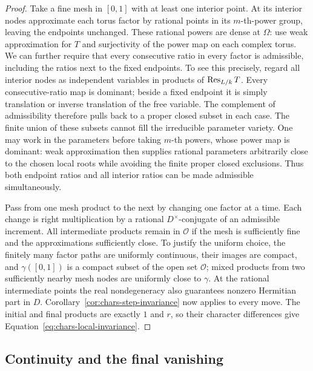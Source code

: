 \begin{proof}
Take a fine mesh in $[0,1]$ with at least one interior point. At its
interior nodes approximate each torus factor by rational points in its
$m$-th-power group, leaving the endpoints unchanged. These rational
powers are dense at $\Omega$: use weak approximation for $T$ and
surjectivity of the power map on each complex torus. We can further
require that every consecutive ratio in every factor is admissible,
including the ratios next to the fixed endpoints. To see this precisely,
regard all interior nodes as independent variables in products of
$\operatorname{Res}_{L/k}T$. Every consecutive-ratio map is dominant; beside a fixed
endpoint it is simply translation or inverse translation of the free
variable. The complement of admissibility therefore pulls back to a
proper closed subset in each case. The finite union of these subsets
cannot fill the irreducible parameter variety. One may work in the
parameters before taking $m$-th powers, whose power map is dominant:
weak approximation then supplies rational parameters arbitrarily close
to the chosen local roots while avoiding the finite proper closed
exclusions. Thus both endpoint ratios and all interior ratios can be
made admissible simultaneously.

Pass from one mesh product to the next by changing one factor at a
time. Each change is right multiplication by a rational
$D^\times$-conjugate of an admissible increment. All intermediate
products remain in $\mathcal O$ if the mesh is sufficiently fine and
the approximations sufficiently close. To justify the uniform choice,
the finitely many factor paths are uniformly continuous, their images
are compact, and $\gamma([0,1])$ is a compact subset of the open set
$\mathcal O$; mixed products from two sufficiently nearby mesh nodes
are uniformly close to $\gamma$. At the rational intermediate points
the real nondegeneracy also guarantees nonzero Hermitian part in $D$.
Corollary~\ref{cor:chars-step-invariance} now applies to every move.
The initial and final products are exactly $1$ and $r$, so their
character differences give Equation~\ref{eq:chars-local-invariance}.
\end{proof}

\subsection{Continuity and the final vanishing}


